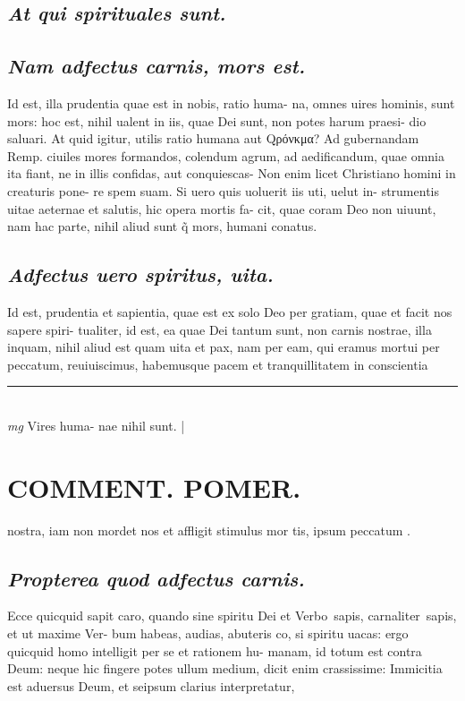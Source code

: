 \documentclass{article}
\begin{document}
\begin{pages}
\subsection*{\textit{At qui spirituales sunt. }}
{}
\subsection*{\textit{Nam adfectus carnis, mors est. }}\pstart Id est, illa prudentia quae est in nobis, ratio huma- na, omnes uires hominis, sunt mors: hoc est, nihil ualent in iis, quae Dei sunt, non potes harum praesi- dio saluari. At quid igitur, utilis ratio humana aut Qρόνκμα? Ad gubernandam Remp. ciuiles mores formandos, colendum agrum, ad aedificandum, quae omnia ita fiant, ne in illis confidas, aut conquiescas- Non enim licet Christiano homini in creaturis pone- re spem suam. Si uero quis uoluerit iis uti, uelut in- strumentis uitae aeternae et salutis, hic opera mortis fa- cit, quae coram Deo non uiuunt, nam hac parte, nihil aliud sunt q̃ mors, humani conatus.   \pend
{}
{}
\subsection*{\textit{Adfectus uero spiritus, uita. }}\pstart Id est, prudentia et sapientia, quae est ex solo Deo per gratiam, quae et facit nos sapere spiri- tualiter, id est, ea quae Dei tantum sunt, non carnis nostrae, illa inquam, nihil aliud est quam uita et pax, nam per eam, qui eramus mortui per peccatum, reuiuiscimus, habemusque pacem et tranquillitatem in conscientia  \pend
\vspace{0.5cm}\noindent
\vspace{0.2cm}\rule{1cm}{0.2pt}\\ 
\hspace{0.2cm}\textit{mg}
\footnotesize Vires huma- nae nihil sunt.  
\normalsize| 
\section*{COMMENT. POMER.  }\pstart nostra, iam non mordet nos et affligit stimulus mor tis, ipsum peccatum .  \pend
{}
{}
\subsection*{\textit{Propterea quod adfectus carnis. }}\pstart Ecce quicquid sapit caro, quando sine spiritu Dei et Verbo sapis, carnaliter sapis, et ut maxime Ver- bum habeas, audias, abuteris co, si spiritu uacas: ergo quicquid homo intelligit per se et rationem hu- manam, id totum est contra Deum: neque hic fingere potes ullum medium, dicit enim crassissime: Immicitia est aduersus Deum, et seipsum clarius interpretatur,  \pend
{}
{}

\end{pages}
\end{document}
